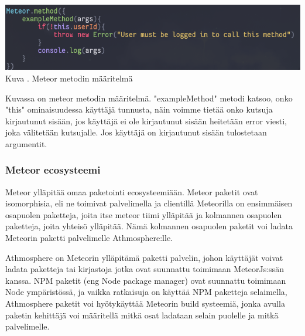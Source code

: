 \documentclass[11pt,a4paper,titlepage,oneside]{article}
\begin{document}
\includegraphics[width=15cm]{src/public/methodexample.png}\\
Kuva \getImgCount {}. Meteor metodin määritelmä
\medskip

Kuvassa on meteor metodin määritelmä. "exampleMethod"{} metodi katsoo, onko "this"{} ominaisuudessa käyttäjä tunnusta, näin voimme tietää onko kutsuja kirjautunut sisään,
jos käyttäjä ei ole kirjautunut sisään heitetään error viesti, joka välitetään kutsujalle.
Jos käyttäjä on kirjautunut sisään tulostetaan argumentit. 
\medskip




\subsubsection{Meteor ecosysteemi}


%


Meteor ylläpitää omaa paketointi ecosysteemiään.
Meteor paketit ovat isomorphisia, eli ne toimivat palvelimella ja clientillä 
Meteorilla on ensimmäisen osapuolen paketteja, joita itse meteor tiimi ylläpitää ja kolmannen osapuolen paketteja,
joita yhteisö ylläpitää. Nämä kolmannen osapuolen paketit voi ladata Meteorin paketti palvelimelle Athmosphere:lle. 
\medskip


Athmosphere on Meteorin ylläpitämä paketti palvelin, johon käyttäjät voivat ladata paketteja tai kirjastoja jotka ovat suunnattu toimimaan MeteorJs:ssän kanssa.
NPM paketit (eng Node package manager) ovat suunnattu toimimaan Node ympäristössä, ja vaikka ratkaisuja on käyttää NPM paketteja selaimella, 
Athmosphere paketit voi hyötykäyttää Meteorin build systeemiä, jonka avulla paketin kehittäjä voi määritellä mitkä osat ladataan selain puolelle ja mitkä palvelimelle.





\newpage
{}%
\end{document}
